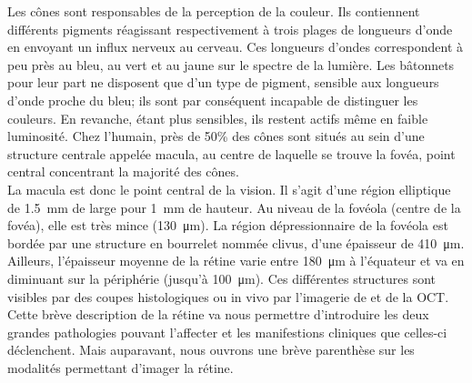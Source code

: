 Les cônes sont responsables de la perception de la couleur. Ils contiennent différents pigments réagissant respectivement à trois plages de longueurs d'onde en envoyant un influx nerveux au cerveau. Ces longueurs d'ondes correspondent à peu près au bleu, au vert et au jaune sur le spectre de la lumière. Les bâtonnets pour leur part ne disposent que d'un type de pigment, sensible aux longueurs d'onde proche du bleu; ils sont par conséquent incapable de distinguer les couleurs. En revanche, étant plus sensibles, ils restent actifs même en faible luminosité. Chez l'humain, près de 50\% des cônes sont situés au sein d'une structure centrale appelée macula, au centre de laquelle se trouve la fovéa, point central concentrant la majorité des cônes. 
\\
La macula est donc le point central de la vision. Il s'agit d'une région elliptique de \SI{1,5}{\milli\meter} de large pour \SI{1}{\milli\meter} de hauteur. Au niveau de la fovéola (centre de la fovéa), elle est très mince (\SI{130}{\micro\meter}). La région dépressionnaire de la fovéola est bordée par une structure en bourrelet nommée clivus, d'une épaisseur de \SI{410}{\micro\meter}. Ailleurs, l'épaisseur moyenne de la rétine varie entre \SI{180}{\micro\meter} à l'équateur et va en diminuant sur la périphérie (jusqu'à \SI{100}{\micro\meter}). Ces différentes structures sont visibles par des coupes histologiques ou in vivo par l'imagerie de \fundus{} et de la \ac{OCT}.
\\
Cette brève description de la rétine va nous permettre d'introduire les deux grandes pathologies pouvant l'affecter et les manifestions cliniques que celles-ci déclenchent. Mais auparavant, nous ouvrons une brève parenthèse sur les modalités permettant d'imager la rétine.

